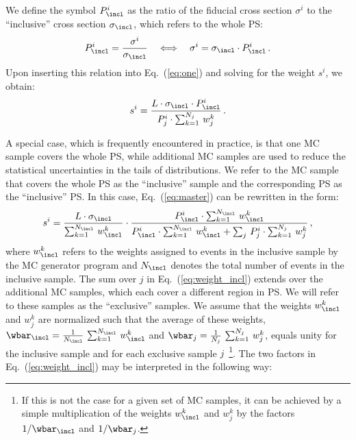 We define the symbol $P_{\incl}^{i}$ as the ratio of the fiducial cross section $\sigma^{i}$ to the ``inclusive'' cross section $\sigma_{\incl}$,
which refers to the whole PS:
\begin{equation*}
P_{\incl}^{i} = \frac{\sigma^{i}}{\sigma_{\incl}} \quad \Longleftrightarrow \quad \sigma^{i} = \sigma_{\incl} \cdot P_{\incl}^{i} \, .
\label{eq:two}
\end{equation*}
Upon inserting this relation into Eq.~(\ref{eq:one}) and solving for the weight $s^{i}$, we obtain:
\begin{equation}
s^{i} = \frac{L \cdot \sigma_{\incl} \cdot P_{\incl}^{i}}{P_{j}^{i} \cdot \sum_{k=1}^{N_{j}} \, w_{j}^{k}} \, .
\label{eq:master}
\end{equation}

A special case, which is frequently encountered in practice,
is that one MC sample covers the whole PS,
while additional MC samples are used to reduce the statistical uncertainties in the tails of distributions.
We refer to the MC sample that covers the whole PS as the ``inclusive'' sample and the corresponding PS as the ``inclusive'' PS.
In this case, Eq.~(\ref{eq:master}) can be rewritten in the form:
\begin{equation}
s^{i} = \frac{L \cdot \sigma_{\incl}}{\sum_{k=1}^{N_{\incl}} \, w_{\incl}^{k}} \cdot \frac{P_{\incl}^{i} \cdot \sum_{k=1}^{N_{\incl}} \, w_{\incl}^{k}}{P_{\incl}^{i} \cdot \sum_{k=1}^{N_{\incl}} \, w_{\incl}^{k} + \sum_{j} \, P_{j}^{i} \cdot \sum_{k=1}^{N_{j}} \, w_{j}^{k}} \, ,
\label{eq:weight_incl}
\end{equation}
where $w_{\incl}^{k}$ refers to the weights assigned to events in the inclusive sample by the MC generator program and $N_{\incl}$ denotes the total number of events in the inclusive sample.
The sum over $j$ in Eq.~(\ref{eq:weight_incl}) extends over the additional MC samples, which each cover a different region in PS.
We will refer to these samples as the ``exclusive'' samples.
We assume that the weights $w_{\incl}^{k}$ and $w_{j}^{k}$ are normalized such that the average of these weights,
$\wbar_{\incl} = \frac{1}{N_{\incl}} \, \sum_{k=1}^{N_{\incl}} \, w_{\incl}^{k}$ and $\wbar_{j} = \frac{1}{N_{j}} \, \sum_{k=1}^{N_{j}} \, w_{j}^{k}$,
equals unity for the inclusive sample and for each exclusive sample $j$~\footnote{
  If this is not the case for a given set of MC samples,
  it can be achieved by a simple multiplication of the weights $w_{\incl}^{k}$ and $w_{j}^{k}$ by the factors $1/\wbar_{\incl}$ and $1/\wbar_{j}$.
}.
The two factors in Eq.~(\ref{eq:weight_incl}) may be interpreted in the following way:
